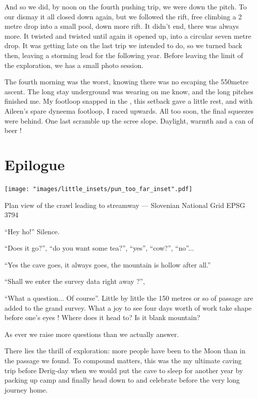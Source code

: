 And so we did, by noon on the fourth pushing trip, we were down the pitch. To our dismay it all closed down again, but we followed the rift, free climbing a 2 metre drop into a small pool, down more rift. It didn't end, there was always more. It twisted and twisted until again it opened up, into a circular seven metre drop. It was getting late on the last trip we intended to do, so we turned back then, leaving a storming lead for the following year. Before leaving the limit of the exploration, we has a small photo session.

The fourth morning was the worst, knowing there was no escaping the 550metre ascent. The long stay underground was wearing on me know, and the long pitches finished me. My footloop snapped in the , this setback gave a little rest, and with Aileen's spare dyneema footloop, I raced upwards. All too soon, the final squeezes were behind. One last scramble up the scree slope. Daylight, warmth and a can of beer !

\section{Epilogue}


\begin{marginfigure}
	\texttt{[image: "images/little\_insets/pun\_too\_far\_inset".pdf]}
	\caption*{Plan view of the \protect{} crawl leading to  \protect{} streamway --- Slovenian National Grid EPSG 3794}
\end{marginfigure}

``Hey ho!'' Silence. 

``Does it go?'', ``do you want some tea?'', ``yes'', ``cow?'', ``no''...

``Yes the cave goes, it always goes, the mountain is hollow after all.''

``Shall we enter the survey data right away ?'',

``What a question... Of course''. Little by little the 150 metres or so of passage are added to the grand survey. What a joy to see four days worth of work take shape before one's eyes ! Where does it head to? Is it blank mountain? 

As ever we raise more questions than we actually answer.

There lies the thrill of exploration: more people have been to the Moon than in the passage we found. To compound matters, this was the my ultimate caving trip before Derig-day when we would put the cave to sleep for another year by packing up camp  and finally head down to  and celebrate before the very long journey home. 





